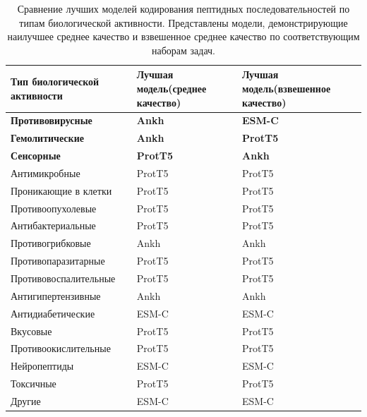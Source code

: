 \documentclass[specification,annotation,times]{itmo-student-thesis}
\begin{document}
\begin{table}[h]
\centering
\small
\caption{Сравнение лучших моделей кодирования пептидных последовательностей по типам биологической активности. Представлены модели, демонстрирующие наилучшее среднее качество и взвешенное среднее качество по соответствующим наборам задач.}
\label{tab:best_models_by_type}

\begin{tabular}{|p{5cm}|p{5cm}|p{5cm}|}
\hline
Тип биологической \newline активности & Лучшая модель\newline(среднее качество) & Лучшая модель\newline(взвешенное качество) \\
\hline
\textbf{Противовирусные} & \textbf{Ankh} & \textbf{ESM-C} \\ \hline
\textbf{Гемолитические} & \textbf{Ankh} & \textbf{ProtT5} \\ \hline
\textbf{Сенсорные} & \textbf{ProtT5} & \textbf{Ankh} \\ \hline
Антимикробные & ProtT5 & ProtT5 \\ \hline
Проникающие в клетки & ProtT5 & ProtT5 \\ \hline
Противоопухолевые & ProtT5 & ProtT5 \\ \hline
Антибактериальные & ProtT5 & ProtT5 \\ \hline
Противогрибковые & Ankh & Ankh \\ \hline
Противопаразитарные & ProtT5 & ProtT5 \\ \hline
Противовоспалительные & ProtT5 & ProtT5 \\ \hline
Антигипертензивные & Ankh & Ankh \\ \hline
Антидиабетические & ESM-C & ESM-C \\ \hline
Вкусовые & ProtT5 & ProtT5 \\ \hline
Противоокислительные & ProtT5 & ProtT5 \\ \hline
Нейропептиды & ESM-C & ESM-C \\ \hline
Токсичные & ProtT5 & ProtT5 \\ \hline
Другие & ESM-C & ESM-C \\ \hline
\end{tabular}

\end{table}
\end{document}
